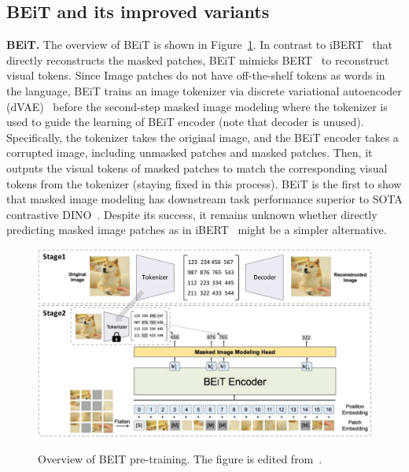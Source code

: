 \documentclass[10pt,journal,compsoc]{IEEEtran}
\begin{document}
\subsection{BEiT and its improved variants} \label{sec:beit}

\textbf{BEiT.} The overview of BEiT is shown in Figure~\ref{fig:beit}. In contrast to iBERT~\cite{dosovitskiy2021an} that directly reconstructs the masked patches, BEiT mimicks BERT~\cite{devlin2019bert} to reconstruct visual tokens. Since Image patches do not have off-the-shelf tokens as words in the language, BEiT trains an image tokenizer via discrete variational autoencoder (dVAE)~\cite{ramesh2021zero} before the second-step masked image modeling where the tokenizer is used to guide the learning of BEiT encoder (note that decoder is unused). Specifically, the tokenizer takes the original image, and the BEiT encoder takes a corrupted image, including unmasked patches and masked patches. Then, it outputs the visual tokens of masked patches to match the corresponding visual tokens from the tokenizer (staying fixed in this process). BEiT is the first to show that masked image modeling has downstream task performance superior to SOTA contrastive DINO~\cite{caron2021emerging}. Despite its success, it remains unknown whether directly predicting masked image patches as in iBERT~\cite{dosovitskiy2021an} might be a simpler alternative.   

\begin{figure}[!htbp]\centering
\includegraphics[width=0.98\linewidth]{fig/2stageBEiT.pdf}\\
\caption{Overview of BEIT pre-training. The figure is edited from~\cite{bao2022beit}.
}
\label{fig:beit}
\end{figure}
\end{document}
